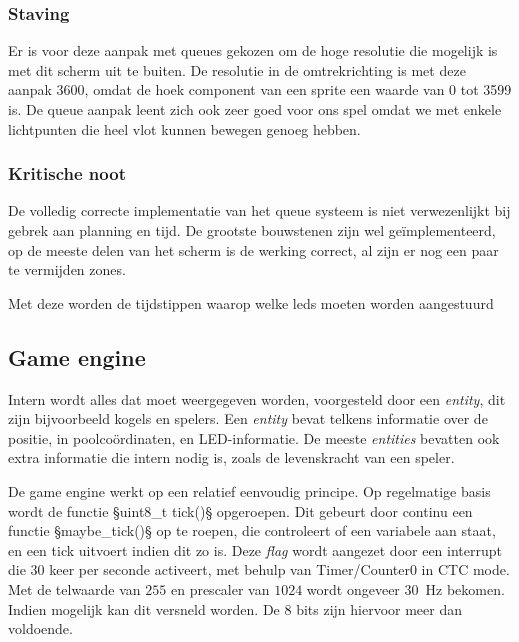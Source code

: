 \documentclass[12pt]{ugentreport}
\begin{document}
\subsubsection{Staving}
Er is voor deze aanpak met queues gekozen om de hoge resolutie die mogelijk is met dit scherm uit te buiten. De resolutie in de 
omtrekrichting is met deze aanpak 3600, omdat de hoek component van een sprite een waarde van 0 tot 3599 is. De queue aanpak leent zich 
ook zeer goed voor ons spel omdat we met enkele lichtpunten die heel vlot kunnen bewegen genoeg hebben.

\subsubsection{Kritische noot}
De volledig correcte implementatie van het queue systeem is niet verwezenlijkt bij gebrek aan planning en tijd. De grootste bouwstenen 
zijn wel geïmplementeerd, op de meeste delen van het scherm is de werking correct, al zijn er nog een paar te vermijden zones.

Met deze worden de tijdstippen waarop welke leds moeten worden aangestuurd 

\subsection{Game engine}
Intern wordt alles dat moet weergegeven worden, voorgesteld door een
\emph{entity}, dit zijn bijvoorbeeld kogels en spelers. Een \emph{entity} bevat
telkens informatie over de positie, in poolcoördinaten, en LED-informatie. De
meeste \emph{entities} bevatten ook extra informatie die intern nodig is, zoals
de levenskracht van een speler.

De game engine werkt op een relatief eenvoudig principe.
Op regelmatige basis wordt de functie §uint8_t tick()§
opgeroepen. Dit gebeurt door continu een functie §maybe_tick()§ op te roepen,
die controleert of een variabele aan staat, en een tick uitvoert indien dit zo
is. Deze \emph{flag} wordt aangezet door een interrupt die 30 keer per seconde
activeert, met behulp van Timer/Counter0 in CTC mode. Met de telwaarde van $255$
en prescaler van $1024$ wordt ongeveer \SI{30}{\hertz} bekomen. Indien mogelijk
kan dit versneld worden. De 8 bits zijn hiervoor meer dan voldoende.
\end{document}
